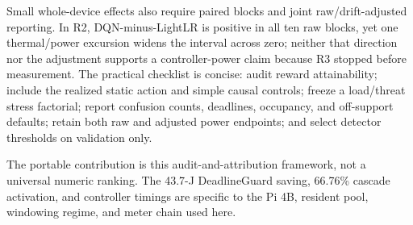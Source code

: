Small whole-device effects also require paired blocks and joint raw/drift-adjusted reporting. In R2, DQN-minus-LightLR is positive in all ten raw blocks, yet one thermal/power excursion widens the interval across zero; neither that direction nor the adjustment supports a controller-power claim because R3 stopped before measurement. The practical checklist is concise: audit reward attainability; include the realized static action and simple causal controls; freeze a load/threat stress factorial; report confusion counts, deadlines, occupancy, and off-support defaults; retain both raw and adjusted power endpoints; and select detector thresholds on validation only.

The portable contribution is this audit-and-attribution framework, not a universal numeric ranking. The 43.7-J DeadlineGuard saving, 66.76\% cascade activation, and controller timings are specific to the Pi 4B, resident pool, windowing regime, and meter chain used here.
